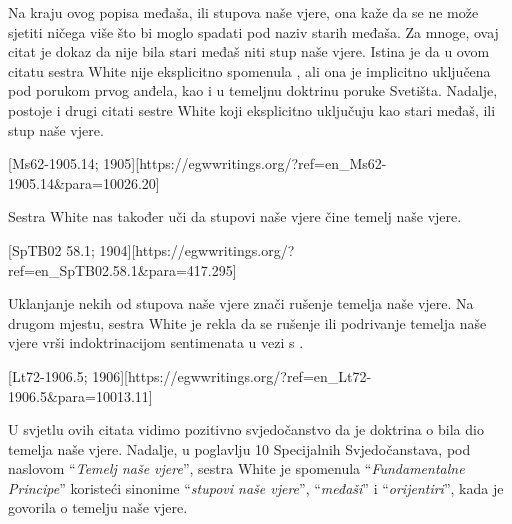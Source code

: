 Na kraju ovog popisa međaša, ili stupova naše vjere, ona kaže da se ne može sjetiti ničega više što bi moglo spadati pod naziv starih međaša. Za mnoge, ovaj citat je dokaz da  nije bila stari međaš niti stup naše vjere. Istina je da u ovom citatu sestra White nije eksplicitno spomenula , ali ona je implicitno uključena pod porukom prvog anđela, kao i u temeljnu doktrinu poruke Svetišta. Nadalje, postoje i drugi citati sestre White koji eksplicitno uključuju  kao stari međaš, ili stup naše vjere.

[Ms62-1905.14; 1905][https://egwwritings.org/?ref=en\_Ms62-1905.14&para=10026.20]

Sestra White nas također uči da stupovi naše vjere čine temelj naše vjere.

[SpTB02 58.1; 1904][https://egwwritings.org/?ref=en\_SpTB02.58.1&para=417.295]

Uklanjanje nekih od stupova naše vjere znači rušenje temelja naše vjere. Na drugom mjestu, sestra White je rekla da se rušenje ili podrivanje temelja naše vjere vrši indoktrinacijom sentimenata u vezi s .

[Lt72-1906.5; 1906][https://egwwritings.org/?ref=en\_Lt72-1906.5&para=10013.11]

U svjetlu ovih citata vidimo pozitivno svjedočanstvo da je doktrina o  bila dio temelja naše vjere. Nadalje, u poglavlju 10 Specijalnih Svjedočanstava, pod naslovom “\textit{Temelj naše vjere}”, sestra White je spomenula “\textit{Fundamentalne Principe}” koristeći sinonime “\textit{stupovi naše vjere}”, “\textit{međaši}” i “\textit{orijentiri}”, kada je govorila o temelju naše vjere.

